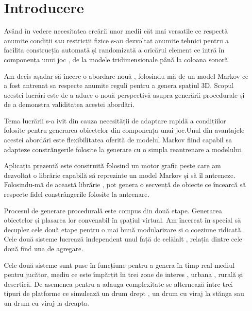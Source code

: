 \chapter*{Introducere} 


Având în vedere necesitatea creării unor medii căt mai versatile ce respectă anumite condiții sau restricții fizice s-au dezvoltat anumite tehnici pentru a facilita construcția automată și randomizată a oricărui element ce intră în componența unui joc , de la modele tridimensionale până la coloana sonoră.\par

Am decis așadar să încerc o abordare nouă , folosindu-mă de un model Markov ce a fost antrenat sa respecte anumite reguli pentru a genera spațiul 3D. Scopul acestei lucrări este de a aduce o nouă perspectivă asupra generării procedurale și de a demonstra validitatea acestei abordări.\par

Tema lucrării s-a ivit din cauza necesității de adaptare rapidă a condițiilor folosite pentru generarea obiectelor din componența unui joc.Unul din avantajele acestei abordări este flexibilitatea oferită de modelul Markov fiind capabil sa adapteze constrăngerile folosite la generare cu o simpla reantrenare a modelului.\par

Aplicația prezentă este construită folosind un motor grafic peste care am dezvoltat o librărie capabilă să reprezinte un model Markov și să îl antreneze. Folosindu-mă de această librărie , pot genera o secvență de obiecte ce încearcă să respecte fidel constrângerile folosite la antrenare.\par

Procesul de generare procedurală este compus din două etape. Generarea obiectelor și plasarea lor convenabil în șpațiul virtual. Am încercat în special să decuplez cele două etape pentru o mai bună modularizare și o coeziune ridicată. Cele două sisteme lucrează independent unul față de celălalt , relația dintre cele două find una de agregare.

Cele două sisteme sunt puse în funcțiune pentru a genera în timp real mediul pentru jucător, mediu ce este împărțit în trei zone de interes , urbana , rurală și desertică. De asemenea pentru a adauga complexitate se alternează între trei tipuri de platforme ce simulează un drum drept , un drum cu viraj la stănga sau un drum cu viraj la dreapta.\par
